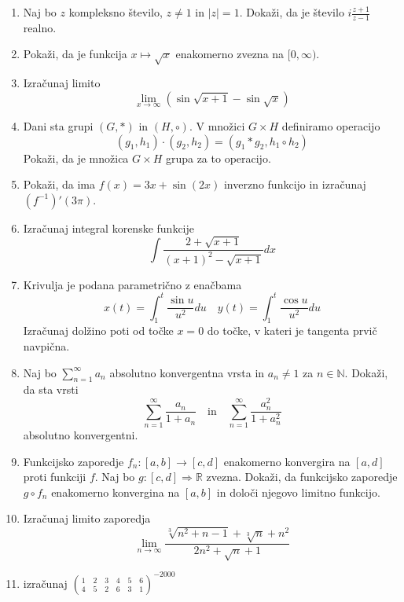 \documentclass[a4paper,12pt]{article}
\newcommand{\bfrac}[2]{\genfrac{(}{)}{0pt}{}{#1}{#2}}
\begin{document}
\begin{enumerate}
\item Naj bo $z$ kompleksno število, $z \neq 1$ in $\mid z \mid = 1$.
Dokaži, da je število $i \frac{z+1}{z-1}$ realno.

\item Pokaži, da je funkcija $x \mapsto \sqrt{x} $ enakomerno zvezna na $[0,\infty)$.

\item Izračunaj limito
\[ \lim_{x \to \infty}(\sin\sqrt{x+1} - \sin\sqrt{x}) \]

\item Dani sta grupi $(G,\ast)$ in $(H,\circ)$. V množici $G \times H$ definiramo operacijo
\[  (g_1,h_1) \cdot (g_2,h_2) = (g_1 \ast g_2,h_1 \circ h_2)       \]
Pokaži, da je množica $G \times H$ grupa za to operacijo.

\item Pokaži, da ima $f(x) = 3x + \sin(2x)$ inverzno funkcijo in izračunaj $(f^{-1})'(3\pi)$.

\item Izračunaj integral korenske funkcije
\[\int \dfrac{2 + \sqrt{x + 1}}{(x + 1)^2 - \sqrt{x + 1}}dx \]

\item Krivulja je podana parametrično z enačbama
\[ x(t) = \int_{1}^{t}\dfrac{\sin u}{u^2}du  \quad y(t) = \int_{1}^{t}\dfrac{\cos u}{u^2}du\] 
Izračunaj dolžino poti od točke $x = 0$ do točke, v kateri je tangenta prvič navpična.

\item Naj bo $\sum_{n=1}^{\infty} a_n$ absolutno konvergentna vrsta in $a_n \neq 1 $ za $n \in \mathbb{N}  $.
Dokaži, da sta vrsti
$$\sum_{n=1}^{\infty} \dfrac{a_n}{1 + a_n} \quad \text{in} \quad \sum_{n=1}^{\infty}\dfrac{a_{n}^{2}}{1 + a_{n}^{2}}$$
absolutno konvergentni.

\item Funkcijsko zaporedje $f_n : [a,b]\rightarrow [c,d]$ enakomerno konvergira na $[a,d]$ proti funkciji $f$.
Naj bo $g : [c,d] \Rightarrow \mathbb{R}$ zvezna. Dokaži, da funkcijsko zaporedje $g \circ f_n $
enakomerno konvergina na $[a,b]$ in določi njegovo limitno funkcijo.

\item Izračunaj limito zaporedja
\[\lim_{n \to \infty} \dfrac{\sqrt[3]{n^2 + n - 1} + \sqrt[3]{n} + n^2}{2n^2 + \sqrt{n} + 1}   \]  

\item izračunaj
$ \displaystyle \bfrac{1\quad 2\quad 3\quad 4\quad 5\quad 6}{4\quad 5\quad 2\quad 6\quad 3\quad 1}^{-2000}   $



\end{enumerate}
\end{document}
